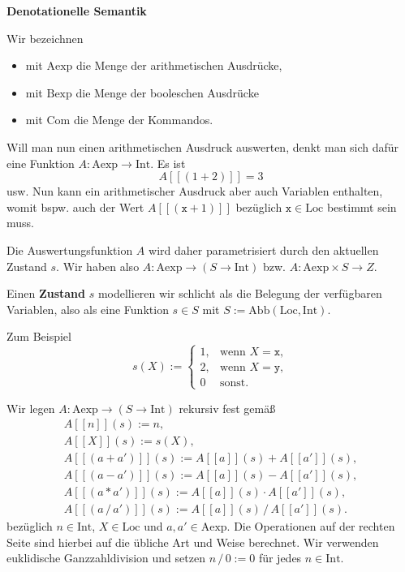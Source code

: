 \documentclass[8pt,fleqn,aspectratio=169]{beamer}
\newcommand{\strong}[1]{\textsf{\textbf{#1}}}
\newcommand{\centerheadline}[1]{%
  \begin{center}\strong{#1}\end{center}}
\newcommand{\parspace}{\vspace{0.8em}}
\newcommand{\code}[1]{\texttt{#1}}
\newcommand{\qb}[1]{[\!\![#1]\!\!]}
\newcommand{\Int}{\mathrm{Int}}
\newcommand{\Loc}{\mathrm{Loc}}
\newcommand{\Aexp}{\mathrm{Aexp}}
\newcommand{\Bexp}{\mathrm{Bexp}}
\newcommand{\Com}{\mathrm{Com}}
\newcommand{\Abb}{\mathrm{Abb}}
\begin{document}
\begin{frame}
\centerheadline{Denotationelle Semantik}
\end{frame}

\begin{frame}
Wir bezeichnen
\begin{itemize}
\item mit $\Aexp$ die Menge der arithmetischen Ausdrücke,
\item mit $\Bexp$ die Menge der booleschen Ausdrücke
\item mit $\Com$ die Menge der Kommandos.
\end{itemize}\pause
Will man nun einen arithmetischen Ausdruck auswerten, denkt
man sich dafür eine Funktion $A\colon\Aexp\to\Int$. Es ist
\[A\qb{(1+2)} = 3\]
usw. Nun kann ein arithmetischer Ausdruck aber auch Variablen enthalten,
womit bspw. auch der Wert $A\qb{(\code{x}+1)}$ bezüglich $\code{x}\in\Loc$
bestimmt sein muss.
\end{frame}

\begin{frame}
Die Auswertungsfunktion $A$ wird daher parametrisiert durch den aktuellen
Zustand $s$. Wir haben also $A\colon\Aexp\to (S\to\Int)$
bzw. $A\colon\Aexp\times S\to Z$.\pause

\parspace
Einen \strong{Zustand} $s$ modellieren wir schlicht als die Belegung
der verfügbaren Variablen, also als eine Funktion $s\in S$ mit
$S:=\Abb(\Loc,\Int)$.\pause

\parspace
Zum Beispiel
\[s(X) := \begin{cases}
1, & \text{wenn $X=\code{x}$},\\
2, & \text{wenn $X=\code{y}$},\\
0 & \text{sonst}. 
\end{cases}\]
\end{frame}

\begin{frame}
Wir legen $A\colon\Aexp\to (S\to\Int)$ rekursiv fest gemäß
\begin{gather*}
A\qb{n}(s) := n,\\
A\qb{X}(s) := s(X),\\
A\qb{(a+a')}(s) := A\qb{a}(s) + A\qb{a'}(s),\\
A\qb{(a-a')}(s) := A\qb{a}(s) - A\qb{a'}(s),\\
A\qb{(a*a')}(s) := A\qb{a}(s) \cdot A\qb{a'}(s),\\
A\qb{(a\,/\,a')}(s) := A\qb{a}(s)\,/\, A\qb{a'}(s).
\end{gather*}
bezüglich $n\in\Int$, $X\in\Loc$ und $a,a'\in\Aexp$.
Die Operationen auf der rechten Seite sind hierbei auf die übliche
Art und Weise berechnet. Wir verwenden euklidische Ganzzahldivision
und setzen $n\,/\,0:=0$ für jedes $n\in\Int$.
\end{frame}
\end{document}
